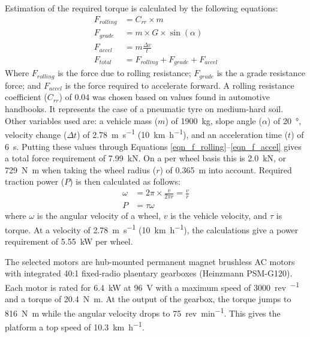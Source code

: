 \documentclass[preprint,authoryear,12pt]{elsarticle}
\begin{document}
        Estimation of the required torque is calculated by the following equations:
        \begin{align}
        \label{eqn_f_rolling}
        F_{rolling} &= C_{rr} \times m\\
        F_{grade} &= m \times G \times \sin(\alpha)\\
        F_{accel} &= m \frac{\Delta v}{t}\\
        \label{eqn_f_accel}
        F_{total} &= F_{rolling} + F_{grade} + F_{accel}
        \end{align}
        Where $F_{rolling}$ is the force due to rolling resistance; $F_{grade}$ is the a grade resistance force; and $F_{accel}$ is the force required to accelerate forward.
        A rolling resistance coefficient ($C_{rr}$) of 0.04 was chosen based on values found in automotive handbooks.
        It represents the case of a pneumatic tyre on medium-hard soil.
        Other variables used are: a vehicle mass ($m$) of \SI{1900}{\kilo\gram}, slope angle ($\alpha$) of \SI{20}{\degree}, velocity change ($\Delta t$) of \SI{2.78}{\metre\per\second} (\SI{10}{\kilo\meter\per\hour}), and an acceleration time ($t$) of \SI{6}{\second}.
        Putting these values through Equations \ref{eqn_f_rolling}--\ref{eqn_f_accel} gives a total force requirement of \SI{7.99}{\kilo\newton}.
        On a per wheel basis this is \SI{2.0}{\kilo\newton}, or \SI{729}{\newton\meter} when taking the wheel radius ($r$) of \SI{0.365}{\meter} into account.
        Required traction power ($P$) is then calculated as follows:
        \begin{align}
        \label{eqn_f_power}
        \omega &= 2 \pi \times \frac{v}{2 \pi r} = \frac{v}{r}\\
        P &= \tau \omega
        \end{align}
        where $\omega$ is the angular velocity of a wheel, $v$ is the vehicle velocity, and $\tau$ is torque.
        At a velocity of \SI{2.78}{\meter\per\second} (\SI{10}{\kilo\meter\per\hour}), the calculations give a power requirement of \SI{5.55}{\kilo\watt} per wheel.

        The selected motors are hub-mounted permanent magnet brushless AC motors with integrated 40:1 fixed-radio plaentary gearboxes (Heinzmann PSM-G120).
        Each motor is rated for \SI{6.4}{\kilo\watt} at \SI{96}{\volt} with a maximum speed of \SI{3000}{rev\per\min} and a torque of \SI{20.4}{\newton\meter}.
        At the output of the gearbox, the torque jumps to \SI{816}{\newton\meter} while the angular velocity drops to \SI{75}{rev\per\minute}.
        This gives the platform a top speed of \SI{10.3}{\kilo\meter\per\hour}.
\end{document}

